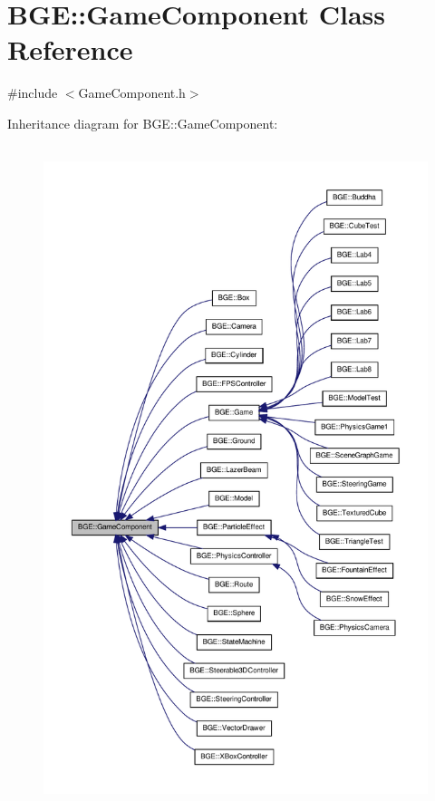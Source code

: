 \hypertarget{class_b_g_e_1_1_game_component}{\section{B\-G\-E\-:\-:Game\-Component Class Reference}
\label{class_b_g_e_1_1_game_component}
}


{\ttfamily \#include $<$Game\-Component.\-h$>$}



Inheritance diagram for B\-G\-E\-:\-:Game\-Component\-:
\nopagebreak
\begin{figure}[H]
\begin{center}
\leavevmode
\includegraphics[height=550pt]{class_b_g_e_1_1_game_component__inherit__graph}
\end{center}
\end{figure}


